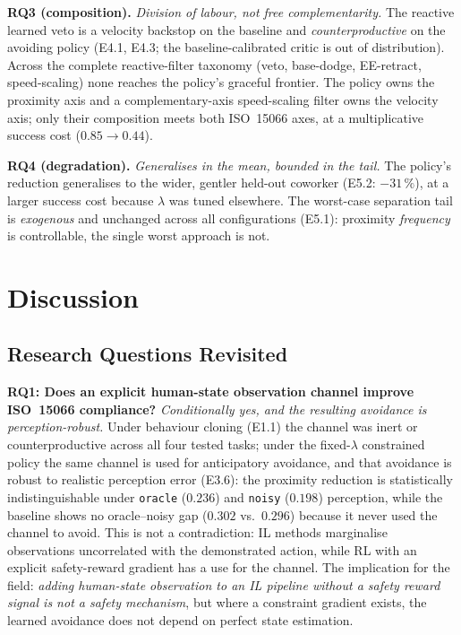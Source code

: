 \documentclass[11pt,a4paper]{report}
\newcommand{\iso}{ISO~15066}
\begin{document}
\textbf{RQ3 (composition).} \emph{Division of labour, not free
complementarity.} The reactive learned veto is a velocity backstop on
the baseline and \emph{counterproductive} on the avoiding policy
(E4.1, E4.3; the baseline-calibrated critic is out of distribution).
Across the complete reactive-filter taxonomy (veto, base-dodge,
EE-retract, speed-scaling) none reaches the policy's graceful
frontier. The policy owns the proximity axis and a complementary-axis
speed-scaling filter owns the velocity axis; only their composition
meets both \iso{} axes, at a multiplicative success cost
($0.85 \to 0.44$).

\textbf{RQ4 (degradation).} \emph{Generalises in the mean, bounded in
the tail.} The policy's reduction generalises to the wider, gentler
held-out coworker (E5.2: $-31\,\%$), at a larger success cost because
$\lambda$ was tuned elsewhere. The worst-case separation tail is
\emph{exogenous} and unchanged across all configurations (E5.1):
proximity \emph{frequency} is controllable, the single worst approach
is not.

\chapter{Discussion}
\label{ch:disc}

\section{Research Questions Revisited}
\label{sec:disc:rqs-revisited}

\textbf{RQ1: Does an explicit human-state observation channel
improve \iso{} compliance?} \emph{Conditionally yes, and the resulting
avoidance is perception-robust.} Under behaviour cloning (E1.1) the
channel was inert or counterproductive across all four tested tasks;
under the fixed-$\lambda$ constrained policy the same channel is used
for anticipatory avoidance, and that avoidance is robust to realistic
perception error (E3.6): the proximity reduction is statistically
indistinguishable under \texttt{oracle} ($0.236$) and \texttt{noisy}
($0.198$) perception, while the baseline shows no oracle--noisy gap
($0.302$ vs.\ $0.296$) because it never used the channel to avoid.
This is not a contradiction: IL methods marginalise observations
uncorrelated with the demonstrated action, while RL with an explicit
safety-reward gradient has a use for the channel. The implication for
the field: \emph{adding human-state observation to an IL pipeline
without a safety reward signal is not a safety mechanism}, but where a
constraint gradient exists, the learned avoidance does not depend on
perfect state estimation.
\end{document}
